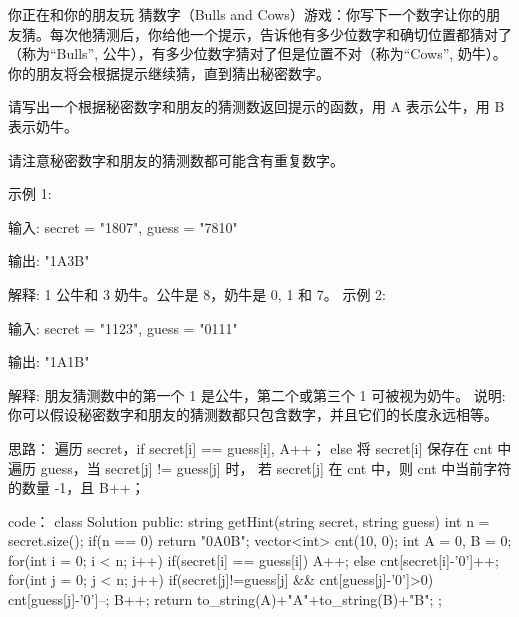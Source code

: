 你正在和你的朋友玩 猜数字（Bulls and Cows）游戏：你写下一个数字让你的朋友猜。每次他猜测后，你给他一个提示，告诉他有多少位数字和确切位置都猜对了（称为“Bulls”, 公牛），有多少位数字猜对了但是位置不对（称为“Cows”, 奶牛）。你的朋友将会根据提示继续猜，直到猜出秘密数字。

请写出一个根据秘密数字和朋友的猜测数返回提示的函数，用 A 表示公牛，用 B 表示奶牛。

请注意秘密数字和朋友的猜测数都可能含有重复数字。

示例 1:

输入: secret = "1807", guess = "7810"

输出: "1A3B"

解释: 1 公牛和 3 奶牛。公牛是 8，奶牛是 0, 1 和 7。
示例 2:

输入: secret = "1123", guess = "0111"

输出: "1A1B"

解释: 朋友猜测数中的第一个 1 是公牛，第二个或第三个 1 可被视为奶牛。
说明: 你可以假设秘密数字和朋友的猜测数都只包含数字，并且它们的长度永远相等。

























思路：
遍历 secret，if secret[i] == guess[i], A++；
		  else 将 secret[i] 保存在 cnt 中
遍历 guess，当 secret[j] != guess[j] 时， 若 secret[j] 在 cnt 中，则 cnt 中当前字符的数量 -1，且 B++；



























code：
class Solution {
public:
    string getHint(string secret, string guess) {
        int n = secret.size();
        if(n == 0) return "0A0B";
        vector<int> cnt(10, 0);
        int A = 0, B = 0;
        for(int i = 0; i < n; i++)
        {
            if(secret[i] == guess[i]) A++;
            else cnt[secret[i]-'0']++;
        }
        for(int j = 0; j < n; j++)
        {
            if(secret[j]!=guess[j] && cnt[guess[j]-'0']>0)
            {
                cnt[guess[j]-'0']--; B++;
            }
        }
        return to_string(A)+"A"+to_string(B)+"B";
    }
};